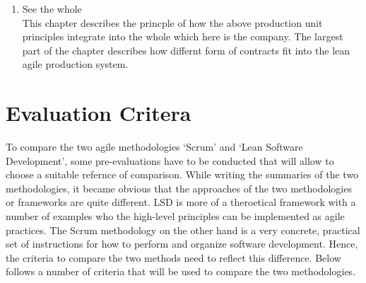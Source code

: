\documentclass[a4paper,11pt,twoside]{article}
\begin{document}
\begin{enumerate}
\item See the whole\\
This chapter describes the princple of how the above production unit principles integrate into the whole which here is the company. The largest part of the chapter describes how differnt form of contracts fit into the lean agile production system. 

\end{enumerate} 

\section{Evaluation Critera}
To compare the two agile methodologies `Scrum' and `Lean Software Development', some pre-evaluations have to be conducted that will allow to choose a suitable refernce of comparison. While writing the summaries of the two methodologies, it became obvious that the approaches of the two methodologies or frameworks are quite different. LSD is more of a theroetical framework with a number of examples who the high-level principles can be implemented as agile practices. The Scrum methodology on the other hand is a very concrete, practical set of instructions for how to perform and organize software development.
Hence, the criteria to compare the two methods need to reflect this difference. Below follows a number of criteria that will be used to compare the two methodologies.
\end{document}
